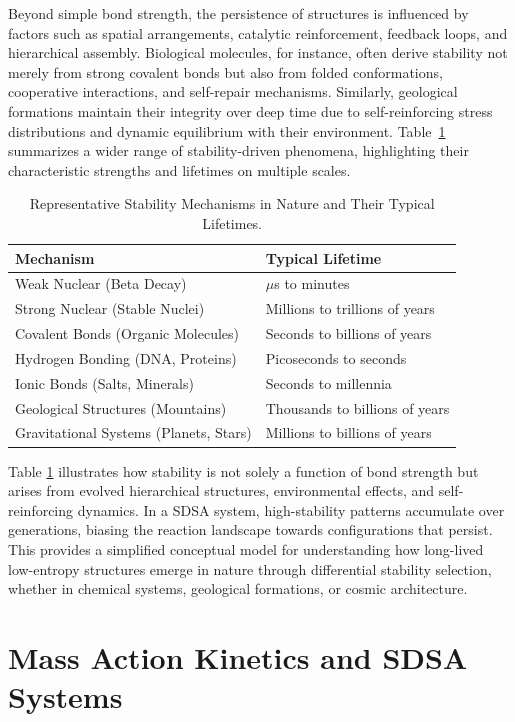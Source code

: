 \documentclass[preprint,12pt]{elsarticle}
\begin{document}
Beyond simple bond strength, the persistence of structures is influenced by factors such as spatial arrangements, catalytic reinforcement, feedback loops, and hierarchical assembly. Biological molecules, for instance, often derive stability not merely from strong covalent bonds but also from folded conformations, cooperative interactions, and self-repair mechanisms. Similarly, geological formations maintain their integrity over deep time due to self-reinforcing stress distributions and dynamic equilibrium with their environment. Table~\ref{tab:binding-forces} summarizes a wider range of stability-driven phenomena, highlighting their characteristic strengths and lifetimes on multiple scales.


\begin{table}
\centering
\caption{Representative Stability Mechanisms in Nature and Their Typical Lifetimes.}
\label{tab:binding-forces}
\begin{tabular}{l l}
\toprule
\textbf{Mechanism} & \textbf{Typical Lifetime} \\
\midrule
Weak Nuclear (Beta Decay) & $\mu$s to minutes \\
Strong Nuclear (Stable Nuclei) & Millions to trillions of years \\
Covalent Bonds (Organic Molecules) & Seconds to billions of years \\
Hydrogen Bonding (DNA, Proteins) & Picoseconds to seconds \\
Ionic Bonds (Salts, Minerals) & Seconds to millennia \\
Geological Structures (Mountains) & Thousands to billions of years \\
Gravitational Systems (Planets, Stars) & Millions to billions of years \\
\bottomrule
\end{tabular}
\end{table}

Table \ref{tab:binding-forces} illustrates how stability is not solely a function of bond strength but arises from evolved hierarchical structures, environmental effects, and self-reinforcing dynamics. In a SDSA system, high-stability patterns accumulate over generations, biasing the reaction landscape towards configurations that persist. This provides a simplified conceptual model for understanding how long-lived low-entropy structures emerge in nature through differential stability selection, whether in chemical systems, geological formations, or cosmic architecture.


\section{Mass Action Kinetics and SDSA Systems}
\label{subsec:mak-forward-limitations}
\end{document}
